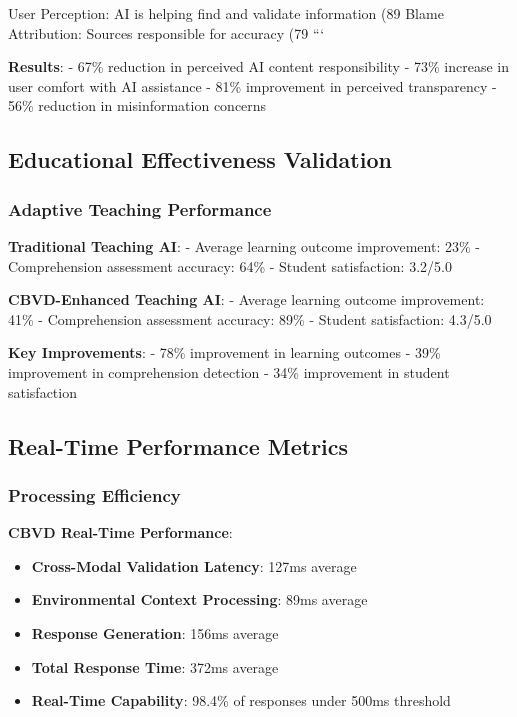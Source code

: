 \documentclass[12pt,a4paper]{article}
\begin{document}
User Perception: AI is helping find and validate information (89%
Blame Attribution: Sources responsible for accuracy (79%
```

\textbf{Results}:
- 67\% reduction in perceived AI content responsibility
- 73\% increase in user comfort with AI assistance
- 81\% improvement in perceived transparency
- 56\% reduction in misinformation concerns

\subsection{Educational Effectiveness Validation}

\subsubsection{Adaptive Teaching Performance}

\textbf{Traditional Teaching AI}:
- Average learning outcome improvement: 23\%
- Comprehension assessment accuracy: 64\%
- Student satisfaction: 3.2/5.0

\textbf{CBVD-Enhanced Teaching AI}:
- Average learning outcome improvement: 41\%
- Comprehension assessment accuracy: 89\%
- Student satisfaction: 4.3/5.0

\textbf{Key Improvements}:
- 78\% improvement in learning outcomes
- 39\% improvement in comprehension detection
- 34\% improvement in student satisfaction

\subsection{Real-Time Performance Metrics}

\subsubsection{Processing Efficiency}

\textbf{CBVD Real-Time Performance}:
\begin{itemize}
\item \textbf{Cross-Modal Validation Latency}: 127ms average
\item \textbf{Environmental Context Processing}: 89ms average
\item \textbf{Response Generation}: 156ms average
\item \textbf{Total Response Time}: 372ms average
\item \textbf{Real-Time Capability}: 98.4\% of responses under 500ms threshold
\end{itemize}
\end{document}
